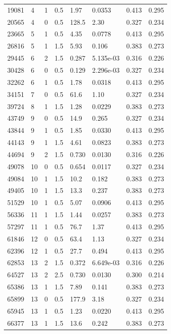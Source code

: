 \documentclass[preview]{standalone}
\begin{document}
{{\begin{tabular}{L{1.2cm}C{1.2cm} C{0.3cm}C{0.5cm} C{1.4cm}C{1.4cm} C{1.4cm}C{1.4cm}}
  19081  &     4  & 1     & 0.5 &  1.97  & 0.0353  & 0.413 &  0.295   \\ 
  20565  &     4  & 0     & 0.5 &  128.5  & 2.30  & 0.327 &  0.234   \\ 
  23665  &     5  & 1     & 0.5 &  4.35  & 0.0778  & 0.413 &  0.295   \\ 
  26816  &     5  & 1     & 1.5 &  5.93  & 0.106  & 0.383 &  0.273   \\ 
  29445  &     6  & 2     & 1.5 &  0.287  & 5.135e-03  & 0.316 &  0.226   \\ 
  30428  &     6  & 0     & 0.5 &  0.129  & 2.296e-03  & 0.327 &  0.234   \\ 
  32262  &     6  & 1     & 0.5 &  1.78  & 0.0318  & 0.413 &  0.295   \\ 
  34151  &     7  & 0     & 0.5 &  61.6  & 1.10  & 0.327 &  0.234   \\ 
  39724  &     8  & 1     & 1.5 &  1.28  & 0.0229  & 0.383 &  0.273   \\ 
  43749  &     9  & 0     & 0.5 &  14.9  & 0.265  & 0.327 &  0.234   \\ 
  43844  &     9  & 1     & 0.5 &  1.85  & 0.0330  & 0.413 &  0.295   \\ 
  44143  &     9  & 1     & 1.5 &  4.61  & 0.0823  & 0.383 &  0.273   \\ 
  44694  &     9  & 2     & 1.5 &  0.730  & 0.0130  & 0.316 &  0.226   \\ 
  49078  &    10  & 0     & 0.5 &  0.654  & 0.0117  & 0.327 &  0.234   \\ 
  49084  &    10  & 1     & 1.5 &  10.2  & 0.182  & 0.383 &  0.273   \\ 
  49405  &    10  & 1     & 1.5 &  13.3  & 0.237  & 0.383 &  0.273   \\ 
  51529  &    10  & 1     & 0.5 &  5.07  & 0.0906  & 0.413 &  0.295   \\ 
  56336  &    11  & 1     & 1.5 &  1.44  & 0.0257  & 0.383 &  0.273   \\ 
  57297  &    11  & 1     & 0.5 &  76.7  & 1.37  & 0.413 &  0.295   \\ 
  61846  &    12  & 0     & 0.5 &  63.4  & 1.13  & 0.327 &  0.234   \\ 
  62396  &    12  & 1     & 0.5 &  27.7  & 0.494  & 0.413 &  0.295   \\ 
  62853  &    13  & 2     & 1.5 &  0.372  & 6.649e-03  & 0.316 &  0.226   \\ 
  64527  &    13  & 2     & 2.5 &  0.730  & 0.0130  & 0.300 &  0.214   \\ 
  65386  &    13  & 1     & 1.5 &  7.89  & 0.141  & 0.383 &  0.273   \\ 
  65899  &    13  & 0     & 0.5 &  177.9  & 3.18  & 0.327 &  0.234   \\ 
  65945  &    13  & 1     & 0.5 &  1.23  & 0.0220  & 0.413 &  0.295   \\ 
  66377  &    13  & 1     & 1.5 &  13.6  & 0.242  & 0.383 &  0.273   \\ 
\hline 
\end{tabular} 

}}
\end{document}
